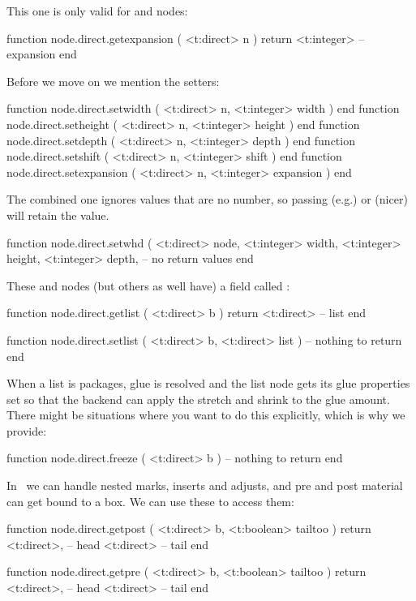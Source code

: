 This one is only valid for  and  nodes:

\starttyping[option=LUA]
function node.direct.getexpansion ( <t:direct> n )
    return <t:integer> -- expansion
end
\stoptyping

Before we move on we mention the setters:

\starttyping[option=LUA]
function node.direct.setwidth     ( <t:direct> n, <t:integer> width     ) end
function node.direct.setheight    ( <t:direct> n, <t:integer> height    ) end
function node.direct.setdepth     ( <t:direct> n, <t:integer> depth     ) end
function node.direct.setshift     ( <t:direct> n, <t:integer> shift     ) end
function node.direct.setexpansion ( <t:direct> n, <t:integer> expansion ) end
\stoptyping

The combined one ignores values that are no number, so passing (e.g.) 
or (nicer)  will retain the value.

\starttyping[option=LUA]
function node.direct.setwhd (
    <t:direct>  node,
    <t:integer> width,
    <t:integer> height,
    <t:integer> depth,
    -- no return values
end
\stoptyping

These  and  nodes (but others as well have) a field
called :

\starttyping[option=LUA]
function node.direct.getlist ( <t:direct> b )
    return <t:direct> -- list
end

function node.direct.setlist ( <t:direct> b, <t:direct> list )
    -- nothing to return
end
\stoptyping

When a list is packages, glue is resolved and the list node gets its glue properties
set so that the backend can apply the stretch and shrink to the glue amount. There might
be situations where you want to do this explicitly, which is why we provide:

\starttyping[option=LUA]
function node.direct.freeze ( <t:direct> b )
    -- nothing to return
end
\stoptyping

In \LUAMETATEX\ we can handle nested marks, inserts and adjusts, and
pre and post material can get bound to a box. We can use these to access them:

\starttyping[option=LUA]
function node.direct.getpost ( <t:direct> b, <t:boolean> tailtoo )
    return
        <t:direct>, -- head
        <t:direct>  -- tail
end

function node.direct.getpre ( <t:direct> b, <t:boolean> tailtoo )
    return
        <t:direct>, -- head
        <t:direct>  -- tail
end
\stoptyping

